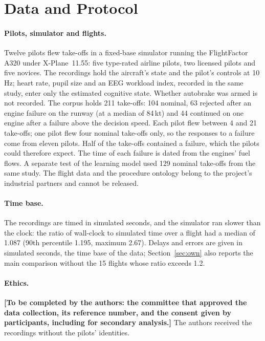 \documentclass{llncs}
\begin{document}
\section{Data and Protocol}
\label{sec:protocol}

\paragraph{Pilots, simulator and flights.} Twelve pilots flew take-offs in a fixed-base simulator running the FlightFactor A320 under
X-Plane~11.55: five type-rated airline pilots, two licensed pilots and five novices. The recordings hold the aircraft's state and the
pilot's controls at 10\,Hz; heart rate, pupil size and an EEG workload index, recorded in the same study, enter only the estimated
cognitive state. Whether autobrake was armed is not recorded. The corpus holds 211 take-offs: 104 nominal, 63 rejected after an engine failure on the runway (at a median
of 84\,kt) and 44 continued on one engine after a failure above the decision speed. Each pilot flew between 4 and 21 take-offs; one pilot
flew four nominal take-offs only, so the responses to a failure come from eleven pilots. Half of the take-offs contained a failure, which
the pilots could therefore expect. The time of each failure is dated from the engines' fuel flows. A separate test of the learning model
used 129 nominal take-offs from the same study. The flight data and the procedure ontology belong to the project's industrial partners
and cannot be released.

\paragraph{Time base.} The recordings are timed in simulated seconds, and the simulator ran slower than the clock: the ratio of
wall-clock to simulated time over a flight had a median of 1.087 (90th percentile 1.195, maximum 2.67). Delays and errors are given in
simulated seconds, the time base of the data; Section~\ref{sec:own} also reports the main comparison without the 15 flights whose ratio
exceeds 1.2.

\paragraph{Ethics.} \textbf{[To be completed by the authors: the committee that approved the data collection, its reference number,
and the consent given by participants, including for secondary analysis.]} The authors received the recordings without the pilots'
identities.
\end{document}
